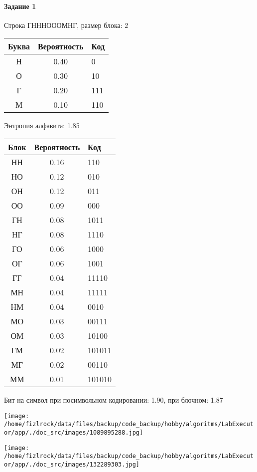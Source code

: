 \documentclass[a4paper, 12pt]{article}
\begin{document}
\paragraph{Задание 1}

Строка ГНННОООМНГ, размер блока: 2
\begin{center}
 \begin{tabular}{ |c|c|l| } 
  \hline
     Буква & Вероятность & Код\\ \hline
Н & 0.40 & 0\\\hline
О & 0.30 & 10\\\hline
Г & 0.20 & 111\\\hline
М & 0.10 & 110
\\ \hline \end{tabular}
\end{center}
Энтропия алфавита: 1.85
\begin{center}
 \begin{tabular}{ |c|c|l| } 
  \hline
     Блок & Вероятность & Код\\ \hline
НН & 0.16 & 110\\\hline
НО & 0.12 & 010\\\hline
ОН & 0.12 & 011\\\hline
ОО & 0.09 & 000\\\hline
ГН & 0.08 & 1011\\\hline
НГ & 0.08 & 1110\\\hline
ГО & 0.06 & 1000\\\hline
ОГ & 0.06 & 1001\\\hline
ГГ & 0.04 & 11110\\\hline
МН & 0.04 & 11111\\\hline
НМ & 0.04 & 0010\\\hline
МО & 0.03 & 00111\\\hline
ОМ & 0.03 & 10100\\\hline
ГМ & 0.02 & 101011\\\hline
МГ & 0.02 & 00110\\\hline
ММ & 0.01 & 101010
\\ \hline \end{tabular}
\end{center}
Бит на символ при посимвольном кодировании: 1.90, при блочном: 1.87

\texttt{[image: /home/fizlrock/data/files/backup/code\_backup/hobby/algoritms/LabExecutor/app/./doc\_src/images/1089895288.jpg]}

\texttt{[image: /home/fizlrock/data/files/backup/code\_backup/hobby/algoritms/LabExecutor/app/./doc\_src/images/132289303.jpg]}
\pagebreak
\end{document}
